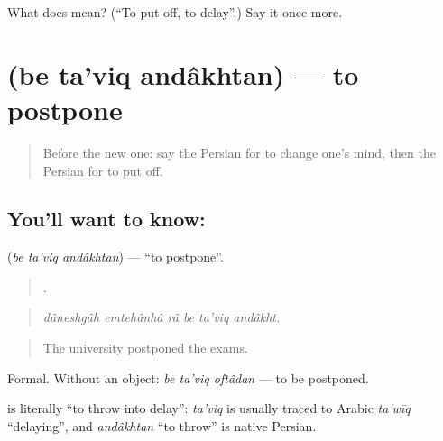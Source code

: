 \begin{tcolorbox}[breakable,colback=teal!4,colframe=teal!35!black,title={Before you move on}]
What does   mean? (\textquotedblleft{}To put off, to delay\textquotedblright{}.) Say it once more.
\end{tcolorbox}
\section[\texorpdfstring{\fa{به} \fa{تعویق} \fa{انداختن} (be ta'viq andâkhtan)}{به تعویق انداختن (be ta'viq andâkhtan)}]{   (be ta'viq andâkhtan) — to postpone}

\label{lesson:FA-C396-be-taviq-andakhtan}



\begin{quote}
Before the new one: say the Persian for to change one's mind, then the Persian for to put off.
\end{quote}

\subsection*{You'll want to know:   }
\textbf{  } (\emph{be ta'viq andâkhtan}) — \textquotedblleft{}to postpone\textquotedblright{}.

\begin{quote}
     .
\end{quote}

\begin{quote}
\emph{dâneshgâh emtehânhâ râ be ta'viq andâkht.}
\end{quote}

\begin{quote}
The university postponed the exams.
\end{quote}

Formal. Without an object: \emph{be ta'viq oftâdan} — to be postponed.

\begin{cousinweb}
\textbf{  } is literally \textquotedblleft{}to throw into delay\textquotedblright{}: \emph{ta'viq} is usually traced to Arabic \emph{ta'wīq} \textquotedblleft{}delaying\textquotedblright{}, and \emph{andâkhtan} \textquotedblleft{}to throw\textquotedblright{} is native Persian.
\end{cousinweb}

